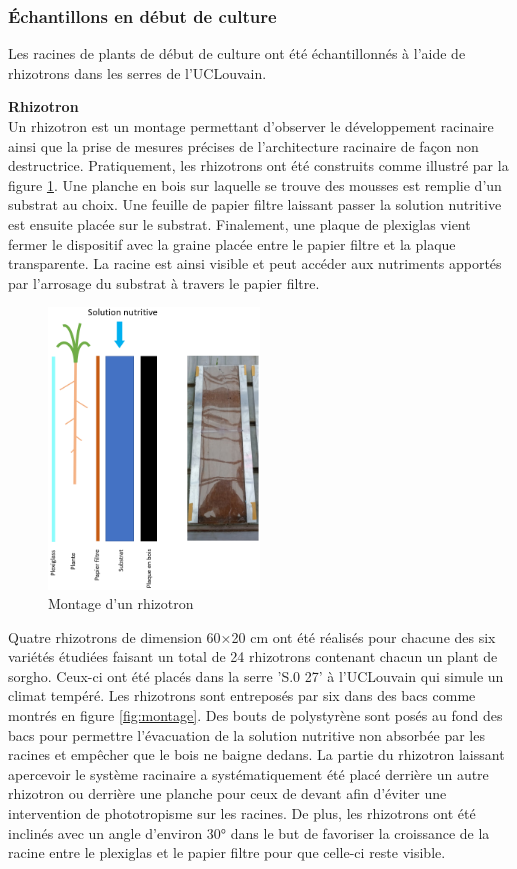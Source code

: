\subsubsection{Échantillons en début de culture}
Les racines de plants de début de culture ont été échantillonnés à l'aide de rhizotrons dans les serres de l'UCLouvain.
\newline

\textbf{Rhizotron} \\
Un rhizotron est un montage permettant d'observer le développement racinaire ainsi que la prise de mesures précises de l'architecture racinaire de façon non destructrice.
Pratiquement, les rhizotrons ont été construits comme illustré par la figure \ref{fig:rhizotron}.
Une planche en bois sur laquelle se trouve des mousses est remplie d'un substrat au choix.
Une feuille de papier filtre laissant passer la solution nutritive est ensuite placée sur le substrat.
Finalement, une plaque de plexiglas vient fermer le dispositif avec la graine placée entre le papier filtre et la plaque transparente.
La racine est ainsi visible et peut accéder aux nutriments apportés par l'arrosage du substrat à travers le papier filtre.
\newpage

\begin{figure}[ht]
\centering
\includegraphics[width=0.5\textwidth]{Image/rhizotron.png}
\caption{Montage d'un rhizotron}
\label{fig:rhizotron}
\end{figure}

Quatre rhizotrons de dimension 60×20 cm ont été réalisés pour chacune des six variétés étudiées faisant un total de 24 rhizotrons contenant chacun un plant de sorgho.
Ceux-ci ont été placés dans la serre 'S.0 27' à l'UCLouvain qui simule un climat tempéré.
Les rhizotrons sont entreposés par six dans des bacs comme montrés en figure \ref{fig:montage}.
Des bouts de polystyrène sont posés au fond des bacs pour permettre l'évacuation de la solution nutritive non absorbée par les racines et empêcher que le bois ne baigne dedans.
La partie du rhizotron laissant apercevoir le système racinaire a systématiquement été placé derrière un autre rhizotron ou derrière une planche pour ceux de devant afin d'éviter une intervention de phototropisme sur les racines.
De plus, les rhizotrons ont été inclinés avec un angle d'environ 30° dans le but de favoriser la croissance de la racine entre le plexiglas et le papier filtre pour que celle-ci reste visible.
\newpage

